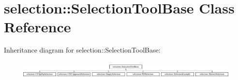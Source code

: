 \hypertarget{classselection_1_1SelectionToolBase}{\section{selection\-:\-:Selection\-Tool\-Base Class Reference}
\label{classselection_1_1SelectionToolBase}
}
Inheritance diagram for selection\-:\-:Selection\-Tool\-Base\-:\begin{figure}[H]
\begin{center}
\leavevmode
\includegraphics[height=0.897436cm]{classselection_1_1SelectionToolBase}
\end{center}
\end{figure}
